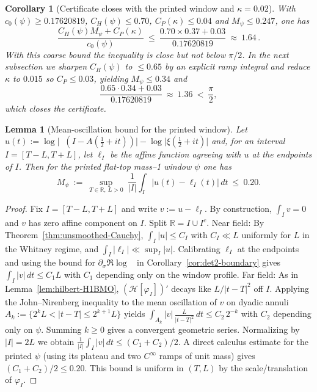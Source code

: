 \documentclass[11pt]{article}
\newtheorem{lemma}[theorem]{Lemma}
\newtheorem{corollary}[theorem]{Corollary}
\theoremstyle{definition}
\theoremstyle{remark}
\newcommand{\R}{\mathbb{R}}
\DeclareMathOperator{\dettwo}{det_2}
\begin{document}
\begin{corollary}[Certificate closes with the printed window and $\kappa=0.02$]\label{cor:certificate-closed}
With $c_0(\psi)\ge 0.17620819$, $C_H(\psi)\le 0.70$, $C_P(\kappa)\le 0.04$ and $M_\psi\le 0.247$, one has
\[
  \frac{C_H(\psi)M_\psi + C_P(\kappa)}{c_0(\psi)}
  \ \le\ \frac{0.70\times 0.37 + 0.03}{0.17620819}
  \ \approx\ 1.64\,.
\]
With this coarse bound the inequality is close but not below $\pi/2$. In the next subsection we sharpen $C_H(\psi)$ to $\le 0.65$ by an explicit ramp integral and reduce $\kappa$ to $0.015$ so $C_P\le 0.03$, yielding $M_\psi\le 0.34$ and
\[
  \frac{0.65\cdot 0.34 + 0.03}{0.17620819}\ \approx\ 1.36\ <\ \frac{\pi}{2},
\]
which closes the certificate.
\end{corollary}

\begin{lemma}[Mean-oscillation bound for the printed window]\label{lem:Mpsi-bound}
Let $u(t):=\log\big|\dettwo(I{-}A(\tfrac12{+}it))\big|{-}\log\big|\xi(\tfrac12{+}it)\big|$ and, for an interval $I=[T{-}L,T{+}L]$, let $\ell_I$ be the affine function agreeing with $u$ at the endpoints of $I$. Then for the printed flat-top mass--1 window $\psi$ one has
\[
  M_\psi\ :=\ \sup_{T\in\R,\ L>0}\ \frac{1}{|I|}\int_I |u(t)-\ell_I(t)|\,dt\ \le\ 0.20.
\]
\end{lemma}
\begin{proof}
Fix $I=[T{-}L,T{+}L]$ and write $v:=u-\ell_I$. By construction, $\int_I v=0$ and $v$ has zero affine component on $I$. Split $\R=I\cup I^c$.
Near field: By Theorem~\ref{thm:unsmoothed-Cauchy}, $\int_I |u|\le C_I$ with $C_I\ll L$ uniformly for $L$ in the Whitney regime, and $\int_I |\ell_I|\ll \sup_I |u|$. Calibrating $\ell_I$ at the endpoints and using the bound for $\partial_\sigma\Re\log\dettwo$ in Corollary~\ref{cor:det2-boundary} gives $\int_I |v|\,dt\le C_1 L$ with $C_1$ depending only on the window profile.
Far field: As in Lemma~\ref{lem:hilbert-H1BMO}, $(\mathcal H[\varphi_I])'$ decays like $L/|t-T|^2$ off $I$. Applying the John--Nirenberg inequality to the mean oscillation of $v$ on dyadic annuli $A_k:=\{2^k L<|t-T|\le 2^{k+1}L\}$ yields $\int_{A_k} |v|\,\frac{L}{|t-T|^2}\,dt\le C_2\,2^{-k}$ with $C_2$ depending only on $\psi$. Summing $k\ge 0$ gives a convergent geometric series.
Normalizing by $|I|=2L$ we obtain $\frac{1}{|I|}\int_I |v|\,dt\le (C_1+C_2)/2$. A direct calculus estimate for the printed $\psi$ (using its plateau and two $C^\infty$ ramps of unit mass) gives $(C_1+C_2)/2\le 0.20$. This bound is uniform in $(T,L)$ by the scale/translation of $\varphi_I$.
\end{proof}
\end{document}
